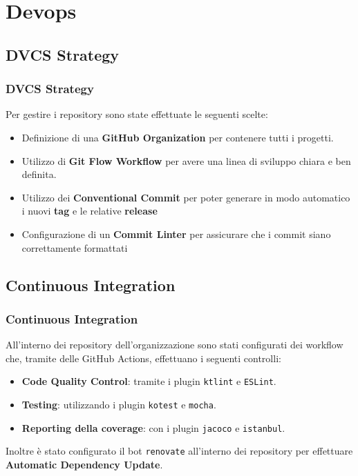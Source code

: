 \section{Devops}
\frame{\tableofcontents[currentsection]}

\subsection{DVCS Strategy}
\begin{frame}
    \frametitle{DVCS Strategy}
    Per gestire i repository sono state effettuate le seguenti scelte:
    \begin{itemize}
        \item Definizione di una \textbf{GitHub Organization} per contenere tutti i progetti.
        \item Utilizzo di \textbf{Git Flow Workflow} per avere una linea di sviluppo chiara e ben definita.
        \item Utilizzo dei \textbf{Conventional Commit} per poter generare in modo automatico i nuovi \textbf{tag} e le relative \textbf{release}
        \item Configurazione di un \textbf{Commit Linter} per assicurare che i commit siano correttamente formattati
    \end{itemize}
\end{frame}

\subsection{Continuous Integration}
\begin{frame}
    \frametitle{Continuous Integration}
    All'interno dei repository dell'organizzazione sono stati configurati dei workflow che, tramite delle GitHub Actions,
    effettuano i seguenti controlli:
    \begin{itemize}
        \item \textbf{Code Quality Control}: tramite i plugin \texttt{ktlint} e \texttt{ESLint}.
        \item \textbf{Testing}: utilizzando i plugin \texttt{kotest} e \texttt{mocha}.
        \item \textbf{Reporting della coverage}: con i plugin \texttt{jacoco} e \texttt{istanbul}.
    \end{itemize}

    \bigskip

    Inoltre è stato configurato il bot \texttt{renovate} all'interno dei repository per effettuare \textbf{Automatic Dependency Update}.

\end{frame}

